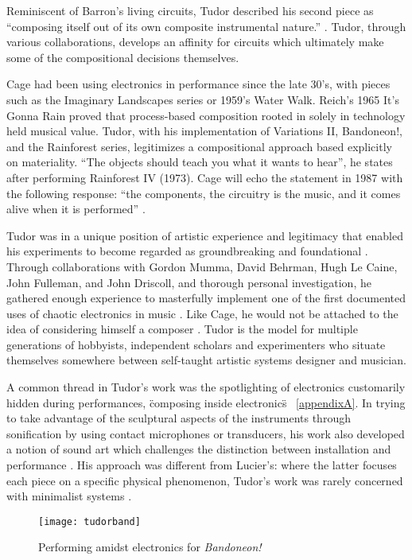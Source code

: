 \begin{itemize}
Reminiscent of Barron’s living circuits, Tudor described his second piece as “composing itself out of its own composite instrumental nature.”  \cite{tudor,kuivila2004}. Tudor, through various collaborations, develops an affinity for circuits which ultimately make some of the compositional decisions themselves. 

Cage had been using electronics in performance since the late 30’s, with pieces such as the Imaginary Landscapes series or 1959’s Water Walk. Reich’s 1965 It’s Gonna Rain proved that process-based composition rooted in solely in technology held musical value. Tudor, with his implementation of Variations II, Bandoneon!, and the Rainforest series, legitimizes a compositional approach based explicitly on materiality. “The objects should teach you what it wants to hear”, he states after performing Rainforest IV (1973). Cage will echo the statement in 1987 with the following response: “the components, the circuitry is the music, and it comes alive when it is performed” \cite{nakai2014}. 

Tudor was in a unique position of artistic experience and legitimacy that enabled his experiments to become regarded as groundbreaking and foundational \cite{collins2004}. Through collaborations with Gordon Mumma, David Behrman, Hugh Le Caine, John Fulleman, and John Driscoll, and thorough personal investigation, he gathered enough experience to masterfully implement one of the first documented uses of chaotic electronics in music \cite{kuivila2004}.  Like Cage, he would not be attached to the idea of considering himself a composer \cite{kuivila1998}. Tudor is the model for multiple generations of hobbyists, independent scholars and experimenters who situate themselves somewhere between self-taught artistic systems designer and musician. 

A common thread in Tudor’s work was the spotlighting of electronics customarily hidden during performances, \"composing inside electronics\" ~\ref{appendixA}. In trying to take advantage of the sculptural aspects of the instruments through sonification by using contact microphones or transducers, his work also developed a notion of sound art which challenges the distinction between installation and performance \cite{driscoll2004}. His approach was different from Lucier’s: where the latter focuses each piece on a specific physical phenomenon, Tudor’s work was rarely concerned with minimalist systems \cite{collins2004,driscoll2004}. 

	\begin{figure}[h!]
	  \caption{Performing amidst electronics for \emph{Bandoneon!}}
	  \centering
	    \texttt{[image: tudorband]}
	\end{figure}


\end{itemize}
